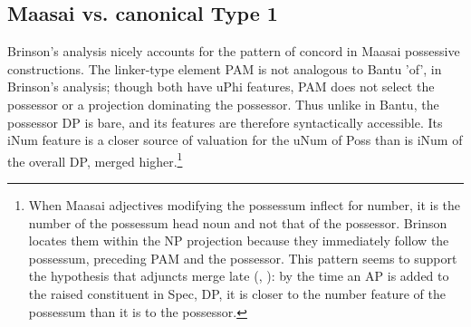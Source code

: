 \documentclass[output=paper
,modfonts
,nonflat]{langsci/langscibook}
\begin{document}
\begin{figure}[!h]
	\begin{exe}
	\end{exe}
\end{figure}
\newpage\noindent
\subsection{Maasai vs. canonical Type 1} \label{sec:6.3}
Brinson's analysis nicely accounts for the pattern of concord in Maasai possessive constructions. The linker-type element PAM is not analogous to Bantu 'of', in Brinson's analysis; though both have uPhi features, PAM does not select the possessor or a projection dominating the possessor. Thus unlike in Bantu, the possessor DP is bare, and its features are therefore syntactically accessible. Its iNum feature is a closer source of valuation for the uNum of Poss than is iNum of the overall DP, merged higher.\footnote{When Maasai adjectives modifying the possessum inflect for number, it is the number of the possessum head noun and not that of the possessor. Brinson locates them within the NP projection because they immediately follow the possessum, preceding PAM and the possessor. This pattern seems to support the hypothesis that adjuncts merge late (\citealt{Lebeaux1988}, \citealt{Chomsky1993}): by the time an AP is added to the raised constituent in Spec, DP, it is closer to the number feature of the possessum than it is to the possessor.} \textsuperscript{}  
\end{document}
